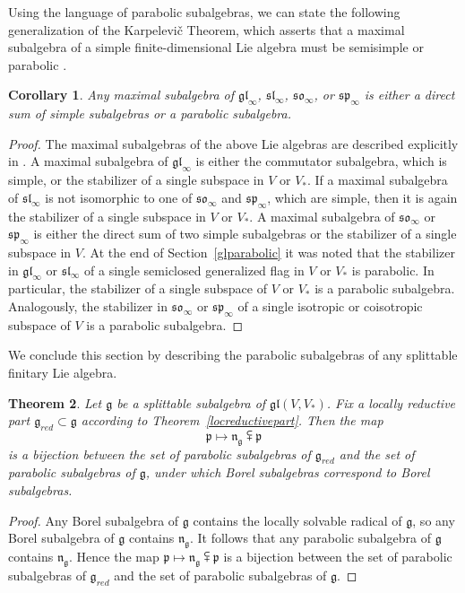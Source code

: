 \documentclass{article}
\def\gl{\mathfrak {gl}}
\def\g{\mathfrak {g}}
\def\n{\mathfrak {n}}
\def\p{\mathfrak {p}}
\def\sl{\mathfrak{sl}}
\def\so{\mathfrak{so}}
\def\sp{\mathfrak{sp}}
\newtheorem{thm}{Theorem}[section]
\newtheorem{cor}[thm]{Corollary}
\begin{document}
Using the language of parabolic subalgebras, we can state the following generalization of the Karpelevi\v c Theorem, which asserts that a maximal subalgebra of a simple finite-dimensional Lie algebra must be semisimple or parabolic \cite{Karpelevic}.


\begin{cor}
Any maximal subalgebra of $\gl_\infty$, $\sl_\infty$, $\so_\infty$, or $\sp_\infty$ is either a direct sum of simple subalgebras or a parabolic subalgebra.
\end{cor}

\begin{proof}
The maximal subalgebras of the above Lie algebras are described explicitly in \cite{DP4}.  
A maximal subalgebra of $\gl_\infty$ is either the commutator subalgebra, which is simple, or the stabilizer of a single subspace in $V$ or $V_*$.  If a maximal subalgebra of $\sl_\infty$ is not isomorphic to one of $\so_\infty$ and $\sp_\infty$, which are simple, then it is again the stabilizer of a single subspace in $V$ or $V_*$.  A maximal subalgebra of $\so_\infty$ or $\sp_\infty$ is either the direct sum of two simple subalgebras or the stabilizer of a single subspace in $V$.  At the end of Section~\ref{glparabolic} it was noted that the stabilizer in $\gl_\infty$ or $\sl_\infty$ of a single semiclosed generalized flag in $V$ or $V_*$ is parabolic.  In particular, the stabilizer of a single subspace of $V$ or $V_*$ is a parabolic subalgebra.  Analogously, the stabilizer in $\so_\infty$ or $\sp_\infty$ of a single isotropic or coisotropic subspace of $V$ is a parabolic subalgebra.
\end{proof}


We conclude this section by describing the parabolic subalgebras of any splittable finitary Lie algebra. 


\begin{thm} \label{mostgeneralthm}
Let $\g$ be a splittable subalgebra of $\gl(V,V_*)$.  Fix a locally reductive part $\g_{red} \subset \g$ according to Theorem~\ref{locreductivepart}.
Then the map $$\p \mapsto \n_\g \subsetplus \p$$
is a bijection between the set of parabolic subalgebras of $\g_{red}$ and the set of parabolic subalgebras of $\g$, under which Borel subalgebras correspond to Borel subalgebras.  
\end{thm}


\begin{proof}
Any Borel subalgebra of $\g$ contains the locally solvable radical of $\g$, so any Borel subalgebra of $\g$ contains $\n_\g$.  It follows that any parabolic subalgebra of $\g$ contains $\n_\g$.  Hence the map  $\p \mapsto \n_\g \subsetplus \p$
is a bijection between the set of parabolic subalgebras of $\g_{red}$ and the set of parabolic subalgebras of $\g$.  
\end{proof}
\end{document}
